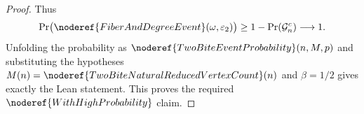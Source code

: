 \begin{proof}
Thus
\[
\Pr\bigl(\noderef{FiberAndDegreeEvent}(\omega,\varepsilon_2)\bigr)
\ge 1-\Pr(\mathcal G_n^c)\longrightarrow 1.
\]
Unfolding the probability as
\(\noderef{TwoBiteEventProbability}(n,M,p)\) and substituting the hypotheses
\(M(n)=\noderef{TwoBiteNaturalReducedVertexCount}(n)\) and
\(\beta=1/2\) gives exactly the Lean statement.  This proves the required
\(\noderef{WithHighProbability}\) claim.
\end{proof}
